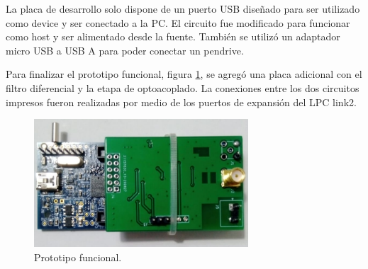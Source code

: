 La placa de desarrollo solo dispone de un puerto USB diseñado para ser utilizado como device y ser conectado a la PC. El circuito fue modificado para funcionar como host y ser alimentado desde la fuente. También se utilizó un adaptador micro USB a USB A para poder conectar un pendrive.  

Para finalizar el prototipo funcional, figura \ref{fig:hardProto}, se agregó una placa adicional con el filtro diferencial y la etapa de optoacoplado. La conexiones entre los dos circuitos impresos fueron realizadas por medio de los puertos de expansión del LPC link2. 

\begin{figure}[ht]
	\centering
	\includegraphics[width=80mm]{./Figures/hardProto.png}
	\caption{Prototipo funcional.}
	\label{fig:hardProto}
\end{figure}